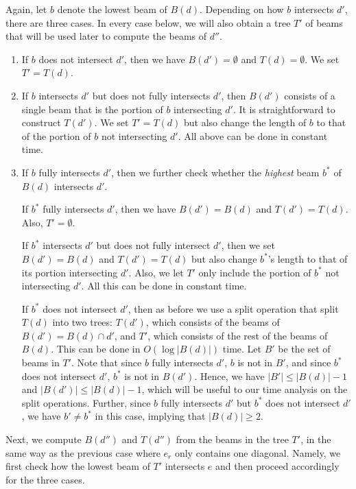 \documentclass[english,runningheads,11pt]{llncs-revised}
\begin{document}
Again, let $b$ denote the lowest beam of $B(d)$. Depending on how $b$
intersects $d'$, there are three cases. In every case below, we will also obtain a tree $T'$
of beams that will be used later to compute the beams of $d''$.

\begin{enumerate}
\item
If $b$ does not intersect $d'$, then we have $B(d')=\emptyset$ and
$T(d)=\emptyset$. We set $T'=T(d)$.

\item
If $b$ intersects $d'$ but does not fully intersects $d'$, then $B(d')$ consists of a
single beam that is the portion of $b$ intersecting $d'$.
It is straightforward to construct $T(d')$.
We set $T'=T(d)$ but also change the length of $b$ to that of the portion of $b$
not intersecting $d'$. All above can be done in constant time.

\item
If $b$ fully intersects $d'$, then we further check whether the
{\em highest} beam $b^*$ of $B(d)$ intersects $d'$.

If $b^*$ fully intersects $d'$, then we have $B(d')=B(d)$ and
$T(d')=T(d)$. Also, $T'=\emptyset$.

If $b^*$ intersects $d'$ but does not fully intersect $d'$, then we
set $B(d')=B(d)$ and $T(d')=T(d)$ but also change $b^*$'s length to
that of its portion intersecting $d'$. Also, we let $T'$  only
include the portion of $b^*$ not intersecting $d'$. All this can be done in constant time.

If $b^*$ does not intersect $d'$,
then as before we use a split operation that split
$T(d)$ into two trees: $T(d')$, which consists of the beams of
$B(d')=B(d)\cap d'$, and $T'$,
which consists of the rest of the beams of $B(d)$. This can be done in $O(\log |B(d)|)$ time.
Let $B'$ be the set of beams in $T'$.
Note that since $b$ fully intersects $d'$, $b$
is not in $B'$, and since $b^*$ does not intersect $d'$, $b^*$ is
not in $B(d')$. Hence, we have $|B'|\leq |B(d)|-1$ and $|B(d')|\leq |B(d)|-1$, which will be useful to our time analysis on the split operations. Further, since $b$ fully intersects $d'$ but $b^*$ does not intersect $d'$, we have $b'\neq b^*$ in this case, implying that $|B(d)|\geq 2$.
\end{enumerate}

Next, we compute $B(d'')$ and $T(d'')$ from the beams in the tree $T'$, in
the same way as the previous case where $e_r$ only contains one
diagonal. Namely, we first check how the lowest beam of $T'$
intersects $e$ and then proceed accordingly for the three cases.
\end{document}
